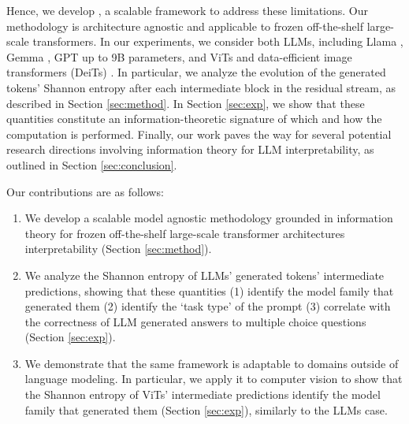 Hence, we develop \entropylens, a scalable framework to address these limitations. Our methodology is architecture agnostic and applicable to frozen off-the-shelf large-scale transformers. In our experiments, we consider both LLMs, including Llama \citep{touvron2023llamaopenefficientfoundation}, Gemma \citep{gemmateam2024gemmaopenmodelsbased}, GPT \citep{radford2018improving} 
up to 9B parameters, and ViTs \citep{wu2020visual} and data-efficient image transformers (DeiTs) \citep{touvron2021training, rw2019timm}.
In particular, we analyze the evolution of the generated tokens' Shannon entropy after each intermediate block in the residual stream, as described in Section \ref{sec:method}. In Section \ref{sec:exp}, we show that these quantities constitute an information-theoretic signature of which and how the computation is performed. Finally, our work paves the way for several potential research directions involving information theory for LLM interpretability, as outlined in Section \ref{sec:conclusion}.


Our contributions are as follows:
\begin{enumerate}
    \item We develop a scalable model agnostic methodology grounded in information theory for frozen off-the-shelf large-scale transformer architectures interpretability (Section \ref{sec:method}).
    \item We analyze the Shannon entropy of LLMs' generated tokens' intermediate predictions, showing that these quantities (1) identify the model family that generated them (2) identify the `task type' of the prompt (3) correlate with the correctness of LLM generated answers to multiple choice questions (Section \ref{sec:exp}).%
    \item We demonstrate that the same framework is adaptable to domains outside of language modeling. In particular, we apply it to computer vision to show that the Shannon entropy of ViTs' intermediate predictions identify the model family that generated them (Section \ref{sec:exp}), similarly to the LLMs case. 
\end{enumerate}


